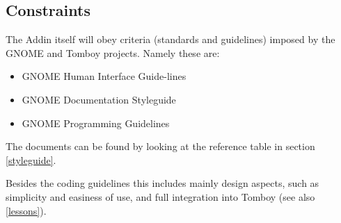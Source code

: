 \subsection{Constraints}
\label{description:constraints}
The Addin itself will obey criteria (standards and guidelines) imposed by the GNOME and Tomboy projects.
Namely these are:
\begin{itemize}
 \item GNOME Human Interface Guide-lines
 \item GNOME Documentation Styleguide
 \item GNOME Programming Guidelines
\end{itemize}
The documents can be found by looking at the reference table in section \ref{styleguide}.

Besides the coding guidelines this includes mainly design aspects, such as simplicity and easiness of use, and full integration into Tomboy (see also \ref{lessons}).
